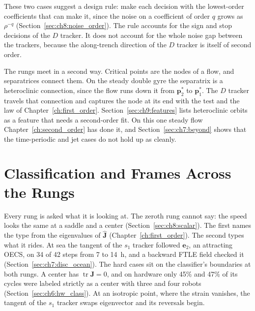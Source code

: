 These two cases suggest a design rule: make each decision with the
lowest-order coefficients that can make it, since the noise on a
coefficient of order $q$ grows as $\rho^{-q}$ (Section~\ref{sec:ch8:noise_order}).
The rule accounts for the sign and stop decisions of the $D$ tracker. It
does not account for the whole noise gap between the trackers, because the
along-trench direction of the $D$ tracker is itself of second order.

The rungs meet in a second way. Critical points are the nodes of a flow,
and separatrices connect them. On the steady double gyre the separatrix is
a heteroclinic connection, since the flow runs down it from
$\mathbf{p}^*_2$ to $\mathbf{p}^*_1$. The $D$ tracker travels that
connection and captures the node at its end with the test and the law of
Chapter~\ref{ch:first_order}. Section~\ref{sec:ch9:features} lists
heteroclinic orbits as a feature that needs a second-order fit. On this one
steady flow Chapter~\ref{ch:second_order} has done it, and
Section~\ref{sec:ch7:beyond} shows that the time-periodic and jet cases
do not hold up as cleanly.

\section{Classification and Frames Across the Rungs}
\label{sec:ch8:class_frames}

Every rung is asked what it is looking at. The zeroth rung cannot say: the
speed looks the same at a saddle and a center
(Section~\ref{sec:ch8:scalar}). The first names the type from the
eigenvalues of $\hat{\mathbf{J}}$ (Chapter~\ref{ch:first_order}). The
second types what it rides. At sea the tangent of the $s_1$ tracker
followed $\mathbf{e}_2$, an attracting OECS, on 34 of 42 steps from 7 to
14~h, and a backward FTLE field checked it (Section~\ref{sec:ch7:disc_ocean}).
The hard cases sit on the classifier's boundaries at both rungs. A center
has $\operatorname{tr}\mathbf{J} = 0$, and on hardware only 45\% and 47\%
of its cycles were labeled strictly as a center with three and four robots
(Section~\ref{sec:ch6:hw_class}). At an isotropic point, where the strain
vanishes, the tangent of the $s_1$ tracker swaps eigenvector and its
reversals begin.

